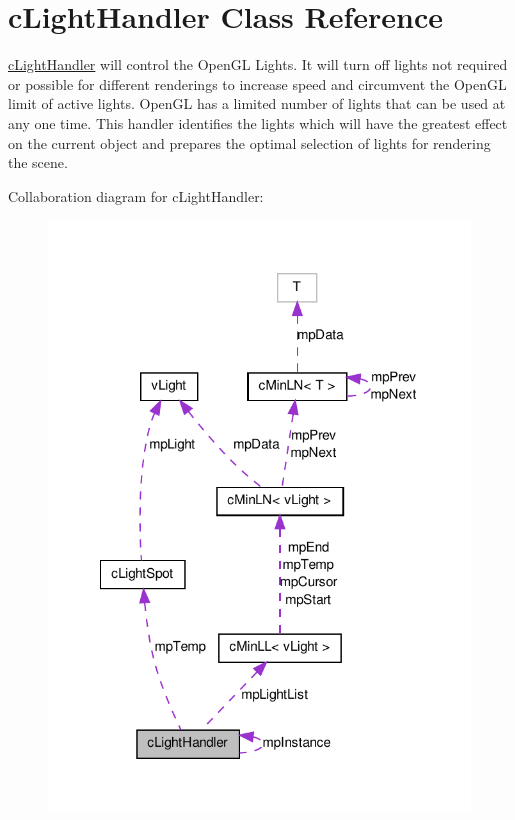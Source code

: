 \hypertarget{classc_light_handler}{
\section{cLightHandler Class Reference}
\label{classc_light_handler}
}


\hyperlink{classc_light_handler}{cLightHandler} will control the OpenGL Lights. It will turn off lights not required or possible for different renderings to increase speed and circumvent the OpenGL limit of active lights. OpenGL has a limited number of lights that can be used at any one time. This handler identifies the lights which will have the greatest effect on the current object and prepares the optimal selection of lights for rendering the scene.  




Collaboration diagram for cLightHandler:
\nopagebreak
\begin{figure}[H]
\begin{center}
\leavevmode
\includegraphics[width=317pt]{classc_light_handler__coll__graph}
\end{center}
\end{figure}
